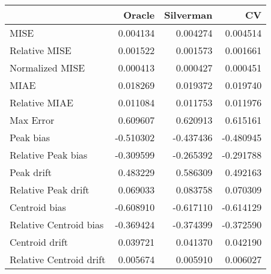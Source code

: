 \begin{tabular}{lrrr}
  \hline
 & Oracle & Silverman & CV \\ 
  \hline
MISE & 0.004134 & 0.004274 & 0.004514 \\ 
  Relative MISE & 0.001522 & 0.001573 & 0.001661 \\ 
  Normalized MISE & 0.000413 & 0.000427 & 0.000451 \\ 
  MIAE & 0.018269 & 0.019372 & 0.019740 \\ 
  Relative MIAE & 0.011084 & 0.011753 & 0.011976 \\ 
  Max Error & 0.609607 & 0.620913 & 0.615161 \\ 
  Peak bias & -0.510302 & -0.437436 & -0.480945 \\ 
  Relative Peak bias & -0.309599 & -0.265392 & -0.291788 \\ 
  Peak drift & 0.483229 & 0.586309 & 0.492163 \\ 
  Relative Peak drift & 0.069033 & 0.083758 & 0.070309 \\ 
  Centroid bias & -0.608910 & -0.617110 & -0.614129 \\ 
  Relative Centroid bias & -0.369424 & -0.374399 & -0.372590 \\ 
  Centroid drift & 0.039721 & 0.041370 & 0.042190 \\ 
  Relative Centroid drift & 0.005674 & 0.005910 & 0.006027 \\ 
   \hline
\end{tabular}
